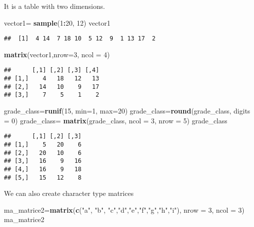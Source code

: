 \documentclass[
]{article}
\newenvironment{Shaded}{\begin{snugshade}}{\end{snugshade}}
\newcommand{\AttributeTok}[1]{\textcolor[rgb]{0.13,0.29,0.53}{#1}}
\newcommand{\DecValTok}[1]{\textcolor[rgb]{0.00,0.00,0.81}{#1}}
\newcommand{\FunctionTok}[1]{\textcolor[rgb]{0.13,0.29,0.53}{\textbf{#1}}}
\newcommand{\NormalTok}[1]{#1}
\newcommand{\OtherTok}[1]{\textcolor[rgb]{0.56,0.35,0.01}{#1}}
\newcommand{\SpecialCharTok}[1]{\textcolor[rgb]{0.81,0.36,0.00}{\textbf{#1}}}
\newcommand{\StringTok}[1]{\textcolor[rgb]{0.31,0.60,0.02}{#1}}
\begin{document}
It is a table with two dimensions.

\begin{Shaded}
\begin{Highlighting}[]
\NormalTok{vector1}\OtherTok{=} \FunctionTok{sample}\NormalTok{(}\DecValTok{1}\SpecialCharTok{:}\DecValTok{20}\NormalTok{, }\DecValTok{12}\NormalTok{)}
\NormalTok{vector1}
\end{Highlighting}
\end{Shaded}

\begin{verbatim}
##  [1]  4 14  7 18 10  5 12  9  1 13 17  2
\end{verbatim}

\begin{Shaded}
\begin{Highlighting}[]
\FunctionTok{matrix}\NormalTok{(vector1,}\AttributeTok{nrow=}\DecValTok{3}\NormalTok{, }\AttributeTok{ncol =} \DecValTok{4}\NormalTok{) }
\end{Highlighting}
\end{Shaded}

\begin{verbatim}
##      [,1] [,2] [,3] [,4]
## [1,]    4   18   12   13
## [2,]   14   10    9   17
## [3,]    7    5    1    2
\end{verbatim}

\begin{Shaded}
\begin{Highlighting}[]
\NormalTok{grade\_class}\OtherTok{=}\FunctionTok{runif}\NormalTok{(}\DecValTok{15}\NormalTok{, }\AttributeTok{min=}\DecValTok{1}\NormalTok{, }\AttributeTok{max=}\DecValTok{20}\NormalTok{)}
\NormalTok{grade\_class}\OtherTok{=}\FunctionTok{round}\NormalTok{(grade\_class, }\AttributeTok{digits =} \DecValTok{0}\NormalTok{)}
\NormalTok{grade\_class}\OtherTok{=} \FunctionTok{matrix}\NormalTok{(grade\_class, }\AttributeTok{ncol =} \DecValTok{3}\NormalTok{, }\AttributeTok{nrow =} \DecValTok{5}\NormalTok{)}
\NormalTok{grade\_class}
\end{Highlighting}
\end{Shaded}

\begin{verbatim}
##      [,1] [,2] [,3]
## [1,]    5   20    6
## [2,]   20   10    6
## [3,]   16    9   16
## [4,]   16    9   18
## [5,]   15   12    8
\end{verbatim}

We can also create character type matrices

\begin{Shaded}
\begin{Highlighting}[]
\NormalTok{ma\_matrice2}\OtherTok{=}\FunctionTok{matrix}\NormalTok{(}\FunctionTok{c}\NormalTok{(}\StringTok{"a"}\NormalTok{, }\StringTok{"b"}\NormalTok{, }\StringTok{"c"}\NormalTok{,}\StringTok{"d"}\NormalTok{,}\StringTok{"e"}\NormalTok{,}\StringTok{"f"}\NormalTok{,}\StringTok{"g"}\NormalTok{,}\StringTok{"h"}\NormalTok{,}\StringTok{"i"}\NormalTok{), }\AttributeTok{nrow =} \DecValTok{3}\NormalTok{, }\AttributeTok{ncol =} \DecValTok{3}\NormalTok{)}
\NormalTok{ma\_matrice2}
\end{Highlighting}
\end{Shaded}
\end{document}
